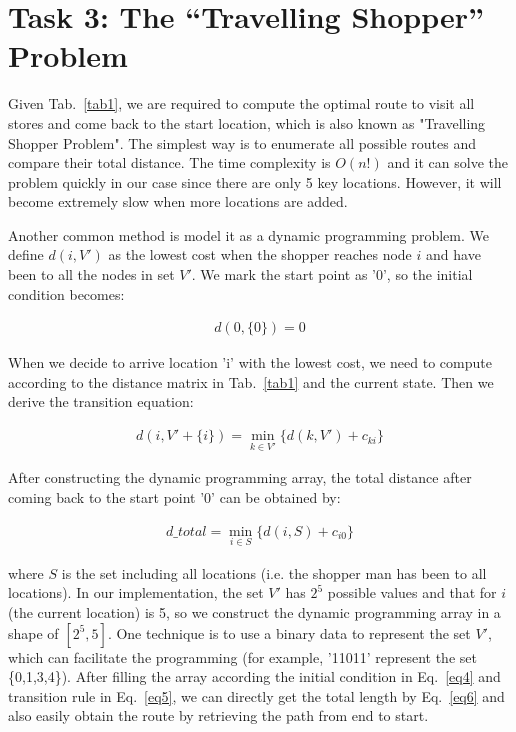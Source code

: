 \documentclass[hyperref]{article}
\theoremstyle{nonumberplain}
\begin{document}
\section{Task 3: The “Travelling Shopper” Problem}
\hspace{1.0em}

Given Tab.~\ref{tab1}, we are required to compute the optimal route to visit all stores and come back to the start location, which is also known as "Travelling Shopper Problem". The simplest way is to enumerate all possible routes and compare their total distance. The time complexity is $O(n!)$ and it can solve the problem quickly in our case since there are only 5 key locations. However, it will become extremely slow when more locations are added.

Another common method is model it as a dynamic programming problem. We define $d(i, V')$ as the lowest cost when the shopper reaches node $i$ and have been to all the nodes in set $V'$. We mark the start point as '0', so the initial condition becomes:


\begin{equation}
\begin{aligned}
d(0,\{0\}) = 0
\label{eq4}
\end{aligned}
\end{equation}

When we decide to arrive location 'i' with the lowest cost, we need to compute according to the distance matrix in Tab.~\ref{tab1} and the current state. Then we derive the transition equation:

\begin{equation}
\begin{aligned}
d(i, V'+\{i\}) = \min_{k \in V'}\{d(k, V') + c_{ki}\}
\label{eq5}
\end{aligned}
\end{equation}

After constructing the dynamic programming array, the total distance after coming back to the start point '0' can be obtained by:

\begin{equation}
\begin{aligned}
d\_total = \min_{i \in S} \{d(i, S) + c_{i0}\}
\label{eq6}
\end{aligned}
\end{equation}

where $S$ is the set including all locations (i.e. the shopper man has been to all locations). In our implementation, the set $V'$ has $2^{5}$ possible values and that for $i$ (the current location) is 5, so we construct the dynamic programming array in a shape of $[2^{5}, 5]$. One technique is to use a binary data to represent the set $V'$, which can facilitate the programming (for example, '11011' represent the set \{0,1,3,4\}). After filling the array according the initial condition in Eq.~\ref{eq4} and transition rule in Eq.~\ref{eq5}, we can directly get the total length by Eq.~\ref{eq6} and also easily obtain the route by retrieving the path from end to start.
\end{document}
